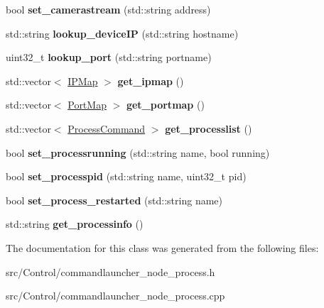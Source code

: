 \begin{DoxyCompactItemize}
bool {\bfseries set\+\_\+camerastream} (std\+::string address)
\item 
\mbox{\label{classCommandLauncherNodeProcess_a42994bb07d8454aa3e43108df91ce6e3}} 
std\+::string {\bfseries lookup\+\_\+device\+IP} (std\+::string hostname)
\item 
\mbox{\label{classCommandLauncherNodeProcess_aff5e52d7b6c222d5d05f57ad17477b86}} 
uint32\+\_\+t {\bfseries lookup\+\_\+port} (std\+::string portname)
\item 
\mbox{\label{classCommandLauncherNodeProcess_a2383f13c8958c2857a1595f1f2b9cf26}} 
std\+::vector$<$ \hyperlink{structIPMap}{I\+P\+Map} $>$ {\bfseries get\+\_\+ipmap} ()
\item 
\mbox{\label{classCommandLauncherNodeProcess_aa0663d595befe68d8ec78e07492e5452}} 
std\+::vector$<$ \hyperlink{structPortMap}{Port\+Map} $>$ {\bfseries get\+\_\+portmap} ()
\item 
\mbox{\label{classCommandLauncherNodeProcess_a08f4dedc35136ae9504bed4df6f8fe26}} 
std\+::vector$<$ \hyperlink{structProcessCommand}{Process\+Command} $>$ {\bfseries get\+\_\+processlist} ()
\item 
\mbox{\label{classCommandLauncherNodeProcess_ad0c0893d8a1ab55040311bbd56504be9}} 
bool {\bfseries set\+\_\+processrunning} (std\+::string name, bool running)
\item 
\mbox{\label{classCommandLauncherNodeProcess_a719b58d628bfa7825f272b4368b9e409}} 
bool {\bfseries set\+\_\+processpid} (std\+::string name, uint32\+\_\+t pid)
\item 
\mbox{\label{classCommandLauncherNodeProcess_a6bd8ee48451942bc7225581f6af80d88}} 
bool {\bfseries set\+\_\+process\+\_\+restarted} (std\+::string name)
\item 
\mbox{\label{classCommandLauncherNodeProcess_a5172c91ea1fa8a0d0d60cd65628a2e41}} 
std\+::string {\bfseries get\+\_\+processinfo} ()
\end{DoxyCompactItemize}


The documentation for this class was generated from the following files\+:\begin{DoxyCompactItemize}
\item 
src/\+Control/commandlauncher\+\_\+node\+\_\+process.\+h\item 
src/\+Control/commandlauncher\+\_\+node\+\_\+process.\+cpp\end{DoxyCompactItemize}
